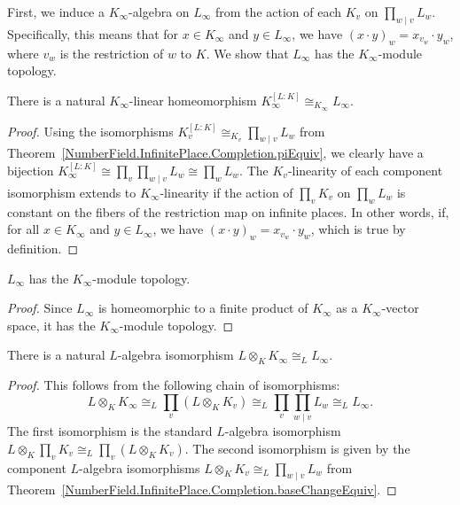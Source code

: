 First, we induce a $K_{\infty}$-algebra on $L_{\infty}$ from the action of each $K_v$ on
$\prod_{w\mid v}L_w$.
Specifically, this means that for $x \in K_{\infty}$ and $y \in L_{\infty}$, we have
$(x \cdot y)_w = x_{v_w} \cdot y_w$, where $v_w$ is the restriction of $w$ to $K$.
We show that $L_{\infty}$ has the $K_{\infty}$-module topology.

\begin{theorem}
  \label{NumberField.InfiniteAdeleRing.piEquiv}
  \leanok
  There is a natural $K_{\infty}$-linear homeomorphism
  $K_{\infty}^{[L:K]} \cong_{K_{\infty}} L_{\infty}$.
\end{theorem}
\begin{proof}
  Using the isomorphisms $K_v^{[L:K]} \cong_{K_v} \prod_{w\mid v}L_w$ from
  Theorem~\ref{NumberField.InfinitePlace.Completion.piEquiv}, we clearly have a bijection
  $K_{\infty}^{[L:K]} \cong \prod_v\prod_{w \mid v} L_w \cong \prod_w L_w$.
  The $K_v$-linearity of each component isomorphism extends to $K_{\infty}$-linearity if the
  action of $\prod_v K_v$ on $\prod_w L_w$ is constant on the fibers of the restriction map on
  infinite places.
  In other words, if, for all $x \in K_{\infty}$ and $y \in L_{\infty}$, we have
  $(x \cdot y)_w = x_{v_w} \cdot y_w$, which is true by definition.
\end{proof}

\begin{theorem}
  \label{NumberField.InfiniteAdeleRing.instIsModuleTopology_fLT}
  \leanok
  $L_{\infty}$ has the $K_{\infty}$-module topology.
\end{theorem}
\begin{proof}
  Since $L_{\infty}$ is homeomorphic to a finite product of $K_{\infty}$ as a $K_{\infty}$-vector
  space, it has the $K_{\infty}$-module topology.
\end{proof}

\begin{theorem}
  \label{NumberField.InfiniteAdeleRing.baseChangeAlgEquiv}
  \leanok
  There is a natural $L$-algebra isomorphism
  $L \otimes_K K_{\infty} \cong_L L_{\infty}$.
\end{theorem}
\begin{proof}
  This follows from the following chain of isomorphisms:
  \[
    L \otimes_K K_{\infty} \cong_L \prod_v (L \otimes_K K_v) \cong_L
      \prod_v \prod_{w\mid v}L_w \cong_L L_{\infty} .
  \]
  The first isomorphism is the standard $L$-algebra isomorphism
  $L \otimes_K \prod_v K_v \cong_L \prod_v (L \otimes_K K_v)$.
  The second isomorphism is given by the component $L$-algebra isomorphisms
  $L \otimes_K K_v \cong_L \prod_{w\mid v}L_w$ from
  Theorem~\ref{NumberField.InfinitePlace.Completion.baseChangeEquiv}.
\end{proof}

